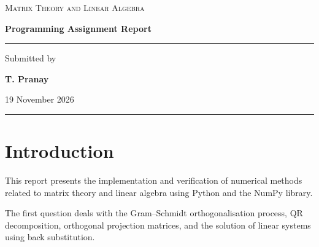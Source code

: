 \documentclass[12pt,a4paper]{article}
\numberwithin{equation}{section}
\begin{document}

\begin{titlepage}
    \centering

    \vspace*{2cm}

    {\large\textsc{Matrix Theory and Linear Algebra}}

    \vspace{2.5cm}

    {\LARGE\bfseries Programming Assignment Report}

    \vspace{1.5cm}

    \rule{0.75\textwidth}{0.5pt}

    \vspace{1.5cm}

    {\large Submitted by}

    \vspace{0.5cm}

    {\Large\bfseries T. Pranay}

    \vspace{1.5cm}

    {\large19 November 2026}

    \vfill

    \rule{0.75\textwidth}{0.5pt}

\end{titlepage}



\tableofcontents

\newpage



\section{Introduction}

This report presents the implementation and verification
of numerical methods related to matrix theory and linear
algebra using Python and the NumPy library.

The first question deals with the Gram--Schmidt
orthogonalisation process, QR decomposition, orthogonal
projection matrices, and the solution of linear systems
using back substitution.
\end{document}
